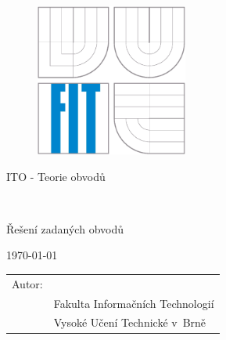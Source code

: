 \begin{titlepage}

	\begin{figure}[!h]
	  \centering
	  \includegraphics[height=5cm]{img/logo.eps}
	\end{figure}

	\vfill

	\begin{center}
		\begin{Large}
			ITO - Teorie obvodů\\
		\end{Large}
		\bigskip
			\begin{Huge}
				\projname\\
			\end{Huge}
		\begin{large}
			Řešení zadaných obvodů
		\end{large}
	\end{center}

	\vfill

	\begin{center}
		\begin{Large}
			\today
		\end{Large}
	\end{center}

	\vfill

	\begin{flushleft}
		\begin{large}
			\begin{tabular}{ll}
			Autor: & \author, \url{\email} \\
			 & Fakulta Informačních Technologií \\
			 & Vysoké Učení Technické v~Brně \\
			\end{tabular}
		\end{large}
	\end{flushleft}
\end{titlepage}
